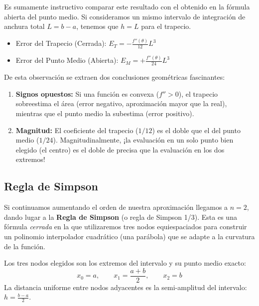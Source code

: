 Es sumamente instructivo comparar este resultado con el obtenido en la fórmula abierta del punto medio. Si consideramos un mismo intervalo de integración de anchura total $L = b-a$, tenemos que $h = L$ para el trapecio. 
\begin{itemize}
    \item Error del Trapecio (Cerrada): $\displaystyle E_T = -\frac{f''(\theta)}{12} L^3$
    \item Error del Punto Medio (Abierta): $\displaystyle E_M = +\frac{f''(\theta)}{24} L^3$
\end{itemize}
De esta observación se extraen dos conclusiones geométricas fascinantes:
\begin{enumerate}
    \item \textbf{Signos opuestos:} Si una función es convexa ($f'' > 0$), el trapecio sobreestima el área (error negativo, aproximación mayor que la real), mientras que el punto medio la subestima (error positivo).
    \item \textbf{Magnitud:} El coeficiente del trapecio ($1/12$) es el doble que el del punto medio ($1/24$). Magnitudinalmente, ¡la evaluación en un solo punto bien elegido (el centro) es el doble de precisa que la evaluación en los dos extremos!
\end{enumerate}
\subsection{Regla de Simpson}

Si continuamos aumentando el orden de nuestra aproximación llegamos a $n = 2$, dando lugar a la \textbf{Regla de Simpson} (o regla de Simpson 1/3). Esta es una fórmula \textit{cerrada} en la que utilizaremos tres nodos equiespaciados para construir un polinomio interpolador cuadrático (una parábola) que se adapte a la curvatura de la función.

Los tres nodos elegidos son los extremos del intervalo y su punto medio exacto:
\[
    x_0 = a, \qquad x_1 = \frac{a+b}{2}, \qquad x_2 = b
\]
La distancia uniforme entre nodos adyacentes es la semi-amplitud del intervalo: $h = \frac{b-a}{2}$. 


